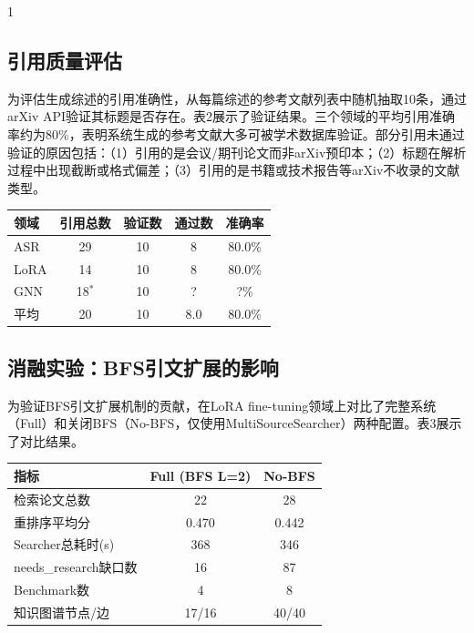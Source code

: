 \documentclass[10.5pt,compsoc,UTF8]{CjC}
\theoremstyle{mystyle}
\begin{document}
\begin{multicols}{1}
\subsection{引用质量评估}

为评估生成综述的引用准确性，从每篇综述的参考文献列表中随机抽取10条，通过arXiv API验证其标题是否存在。表2展示了验证结果。三个领域的平均引用准确率约为80\%，表明系统生成的参考文献大多可被学术数据库验证。部分引用未通过验证的原因包括：（1）引用的是会议/期刊论文而非arXiv预印本；（2）标题在解析过程中出现截断或格式偏差；（3）引用的是书籍或技术报告等arXiv不收录的文献类型。

\begin{table}[htbp]
\vspace {-2.5mm}
\begin{center}
\begin{tabular}{lcccc}
\toprule
\textbf{领域} & \textbf{引用总数} & \textbf{验证数} & \textbf{通过数} & \textbf{准确率} \\
\hline
ASR & 29 & 10 & 8 & 80.0\% \\
LoRA & 14 & 10 & 8 & 80.0\% \\
GNN & 18$^*$ & 10 & ? & ?\% \\
\hline
平均 & 20 & 10 & 8.0 & 80.0\% \\
\bottomrule
\end{tabular}
\label{tab:citations}
\end{center}
\end{table}

\subsection{消融实验：BFS引文扩展的影响}

为验证BFS引文扩展机制的贡献，在LoRA fine-tuning领域上对比了完整系统（Full）和关闭BFS（No-BFS，仅使用MultiSourceSearcher）两种配置。表3展示了对比结果。

\begin{table}[htbp]
\vspace {-2.5mm}
\begin{center}
\begin{tabular}{lcc}
\toprule
\textbf{指标} & \textbf{Full (BFS L=2)} & \textbf{No-BFS} \\
\hline
检索论文总数 & 22 & 28 \\
重排序平均分 & 0.470 & 0.442 \\
Searcher总耗时(s) & 368 & 346 \\
needs\_research缺口数 & 16 & 87 \\
Benchmark数 & 4 & 8 \\
知识图谱节点/边 & 17/16 & 40/40 \\
\bottomrule
\end{tabular}
\label{tab:ablation}
\end{center}
\end{table}


\end{multicols}
\end{document}
